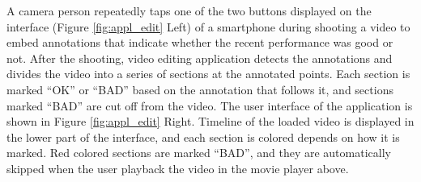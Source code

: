 A camera person repeatedly taps one of the two buttons displayed on the interface (Figure \ref{fig:appl_edit} Left) of a smartphone during shooting a video to embed annotations that indicate whether the recent performance was good or not.
After the shooting, video editing application detects the annotations and divides the video into a series of sections at the annotated points.
Each section is marked ``OK'' or ``BAD'' based on the annotation that follows it, and sections marked ``BAD'' are cut off from the video.
The user interface of the application is shown in Figure \ref{fig:appl_edit} Right.
Timeline of the loaded video is displayed in the lower part of the interface, and each section is colored depends on how it is marked.
Red colored sections are marked ``BAD'', and they are automatically skipped when the user playback the video in the movie player above.
